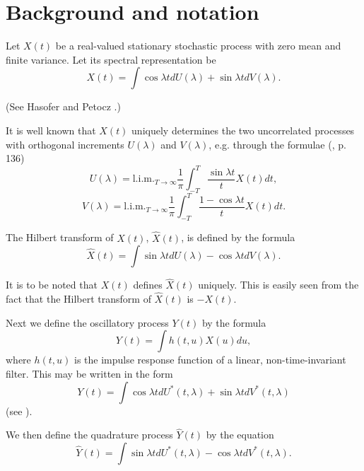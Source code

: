 \documentclass{article}
\begin{document}
\section{Background and notation}

Let $X(t)$ be a real-valued stationary stochastic process with zero mean and
finite variance. Let its spectral representation be
\begin{equation}
\label{eq:spectral}
X(t) = \int \cos \lambda t dU(\lambda) + \sin \lambda t dV(\lambda).
\end{equation}

(See Hasofer and Petocz \cite{hasofer1978}.)

It is well known that $X(t)$ uniquely determines the two uncorrelated processes
with orthogonal increments $U(\lambda)$ and $V(\lambda)$, e.g. through the formulae (\cite{cramer1967}, p.
136)
\begin{equation}
\label{eq:u_lambda}
U(\lambda) = \text{l.i.m.}_{T \to \infty} \frac{1}{\pi} \int_{-T}^{T} \frac{\sin \lambda t}{t} X(t)dt,
\end{equation}
\begin{equation}
\label{eq:v_lambda}
V(\lambda) = \text{l.i.m.}_{T \to \infty} \frac{1}{\pi} \int_{-T}^{T} \frac{1 - \cos \lambda t}{t} X(t)dt.
\end{equation}

The Hilbert transform of $X(t)$, $\hat{X}(t)$, is defined by the formula
\begin{equation}
\label{eq:hilbert}
\hat{X}(t) = \int \sin \lambda t dU(\lambda) - \cos \lambda t dV(\lambda).
\end{equation}

It is to be noted that $X(t)$ defines $\hat{X}(t)$ uniquely.
This is easily seen from the fact that the Hilbert transform of $\hat{X}(t)$ is $-X(t)$.

Next we define the oscillatory process $Y(t)$ by the formula
\begin{equation}
\label{eq:oscillatory}
Y(t) = \int h(t, u)X(u)du,
\end{equation}
where $h(t, u)$ is the impulse response function of a linear, non-time-invariant
filter. This may be written in the form
\begin{equation}
\label{eq:y_spectral}
Y(t) = \int \cos \lambda t dU^*(t, \lambda) + \sin \lambda t dV^*(t, \lambda)
\end{equation}
(see \cite{hasofer1978}).

We then define the quadrature process $\hat{Y}(t)$ by the equation
\begin{equation}
\label{eq:quadrature}
\hat{Y}(t) = \int \sin \lambda t dU^*(t, \lambda) - \cos \lambda t dV^*(t, \lambda).
\end{equation}
\end{document}
